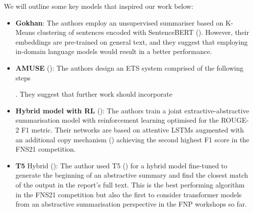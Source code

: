 We will outline some key models that inspired our work below:
\begin{itemize}
    \item \textbf{Gokhan}: The authors employ an unsupervised summariser based on K-Means clustering of sentences encoded with SentenceBERT (\cite{reimers2019sentence}).
    However, their embeddings are pre-trained on general text, and they suggest that employing in-domain language models would result in a better performance.

    \item \textbf{AMUSE} (\cite{litvak-vanetik-2021-summarization}): The authors design an ETS system comprised of the following steps .
    They suggest that further work should incorporate 

    \item \textbf{Hybrid model with RL} (\cite{zmandar-etal-2021-joint}): The authors train a joint extractive-abstractive summarisation model with reinforcement learning optimised for the ROUGE-2 F1 metric.
    Their networks are based on attentive LSTMs augmented with an additional copy mechanism (\cite{vinyals2015pointer}) achieving the second highest F1 score in the FNS21 competition.

    \item \textbf{T5} Hybrid (\cite{orzhenovskii-2021-t5}): The author used T5 (\cite{rayson2019t5}) for a hybrid model fine-tuned to generate the beginning of an abstractive summary and find the closest match of the output in the report’s full text.
    This is the best performing algorithm in the FNS21 competition but also the first to consider transformer models from an abstractive summarisation perspective in the FNP workshops so far.

\end{itemize}


